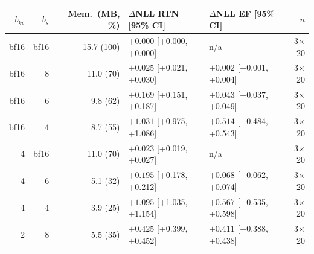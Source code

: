 \begin{tabular}{rrrllr}
\toprule
$b_{kv}$ & $b_s$ & Mem.\ (MB, \%) & $\Delta$NLL RTN [95\% CI] & $\Delta$NLL EF [95\% CI] & $n$ \\
\midrule
bf16 & bf16 & 15.7 (100) & $+0.000$ [+0.000, +0.000] & n/a & 3$\times$20 \\
bf16 & 8 & 11.0 (70) & $+0.025$ [+0.021, +0.030] & $+0.002$ [+0.001, +0.004] & 3$\times$20 \\
bf16 & 6 & 9.8 (62) & $+0.169$ [+0.151, +0.187] & $+0.043$ [+0.037, +0.049] & 3$\times$20 \\
bf16 & 4 & 8.7 (55) & $+1.031$ [+0.975, +1.086] & $+0.514$ [+0.484, +0.543] & 3$\times$20 \\
4 & bf16 & 11.0 (70) & $+0.023$ [+0.019, +0.027] & n/a & 3$\times$20 \\
4 & 6 & 5.1 (32) & $+0.195$ [+0.178, +0.212] & $+0.068$ [+0.062, +0.074] & 3$\times$20 \\
4 & 4 & 3.9 (25) & $+1.095$ [+1.035, +1.154] & $+0.567$ [+0.535, +0.598] & 3$\times$20 \\
2 & 8 & 5.5 (35) & $+0.425$ [+0.399, +0.452] & $+0.411$ [+0.388, +0.438] & 3$\times$20 \\
\bottomrule
\end{tabular}
